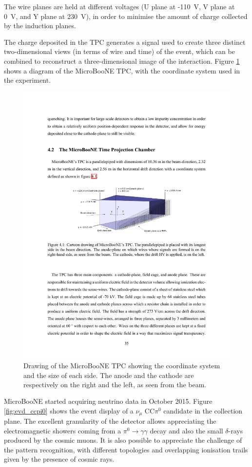 The wire planes are held at different voltages (U plane at -110~V, V plane at 0~V, and Y plane at 230~V), in order to minimise the amount of charge collected by the induction planes.

The charge deposited in the TPC generates a signal used to create three distinct two-dimensional views (in terms of wire and time) of the event, which can be combined to reconstruct a three-dimensional image of the interaction. Figure \ref{fig:tpc_coordinates} shows a diagram of the MicroBooNE TPC, with the coordinate system used in the experiment.

\begin{figure}[htbp]
    \centering
    \includegraphics[width=0.95\linewidth]{figures/tpc_coordinates.pdf}
    \caption{Drawing of the MicroBooNE TPC showing the coordinate system and the size of each side. The anode and the cathode are respectively on the right and the left, as seen from the beam.}
    \label{fig:tpc_coordinates}
\end{figure}

MicroBooNE started acquiring neutrino data in October 2015. Figure \ref{fig:evd_ccpi0} shows the event display of a $\nu_{\mu}$ CC$\pi^0$ candidate in the collection plane. The excellent granularity of the detector allows appreciating the electromagnetic showers coming from a $\pi^0\rightarrow\gamma\gamma$ decay and also the small $\delta$-rays produced by the cosmic muons. It is also possible to appreciate the challenge of the pattern recognition, with different topologies and overlapping ionisation trails given by the presence of cosmic rays. 

